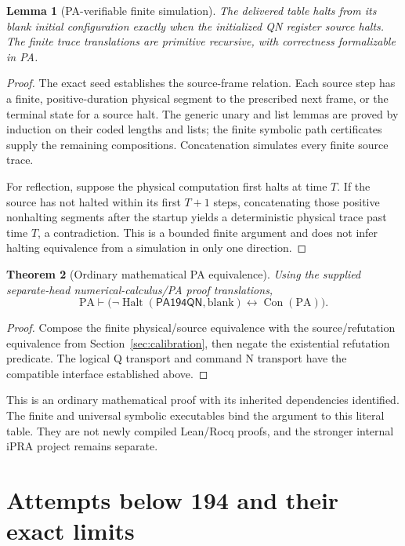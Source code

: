 \documentclass[11pt,letterpaper]{article}
\newtheorem{theorem}{Theorem}[section]
\newtheorem{lemma}[theorem]{Lemma}
\newcommand{\PA}{\mathrm{PA}}
\newcommand{\Con}{\operatorname{Con}}
\newcommand{\Halt}{\operatorname{Halt}}
\newcommand{\M}{\ensuremath{\mathsf{PA194QN}}}
\begin{document}
\begin{lemma}[PA-verifiable finite simulation]
The delivered table halts from its blank initial configuration exactly
when the initialized QN register source halts. The finite trace translations
are primitive recursive, with correctness formalizable in PA.
\end{lemma}
\begin{proof}
The exact seed establishes the source-frame relation. Each source step
has a finite, positive-duration physical segment to the prescribed next
frame, or the terminal state for a source halt. The generic unary and list
lemmas are proved by induction on their coded lengths and lists; the finite
symbolic path certificates supply the remaining compositions. Concatenation
simulates every finite source trace.

For reflection, suppose the physical computation first halts at time $T$.
If the source has not halted within its first $T+1$ steps, concatenating
those positive nonhalting segments after the startup yields a deterministic
physical trace past time $T$, a contradiction. This is a bounded finite
argument and does not infer halting equivalence from a simulation in only
one direction.
\end{proof}

\begin{theorem}[Ordinary mathematical PA equivalence]
Using the supplied separate-head numerical-calculus/PA proof translations,
\[
\PA\vdash\bigl(\neg\Halt(\M,\mathrm{blank})\leftrightarrow\Con(\PA)\bigr).
\]
\end{theorem}
\begin{proof}
Compose the finite physical/source equivalence with the source/refutation
equivalence from Section~\ref{sec:calibration}, then negate the existential
refutation predicate. The logical Q transport and command N transport
have the compatible interface established above.
\end{proof}

This is an ordinary mathematical proof with its inherited dependencies
identified. The finite and universal symbolic executables bind the argument
to this literal table. They are not newly compiled Lean/Rocq proofs, and
the stronger internal iPRA project remains separate.

\section{Attempts below 194 and their exact limits}
\end{document}
